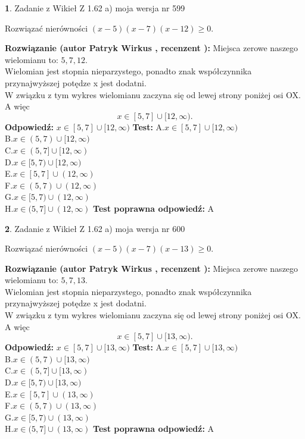 \documentclass[12pt, a4paper]{article}
\theoremstyle{definition} %
\newtheorem{zad}{}
\newcommand{\zadStart}[1]{\begin{zad}#1\newline}
\newcommand{\zadStop}{\end{zad}}
\newcommand{\rozwStart}[2]{\noindent \textbf{Rozwiązanie (autor #1 , recenzent #2): }\newline}
\newcommand{\rozwStop}{\newline}
\newcommand{\odpStart}{\noindent \textbf{Odpowiedź:}\newline}
\newcommand{\odpStop}{\newline}
\newcommand{\testStart}{\noindent \textbf{Test:}\newline}
\newcommand{\testStop}{\newline}
\newcommand{\kluczStart}{\noindent \textbf{Test poprawna odpowiedź:}\newline}
\newcommand{\kluczStop}{\newline}
\begin{document}
\zadStart{Zadanie z Wikieł Z 1.62 a) moja wersja nr 599}

Rozwiązać nierówności $(x-5)(x-7)(x-12)\ge0$.
\zadStop
\rozwStart{Patryk Wirkus}{}
Miejsca zerowe naszego wielomianu to: $5, 7, 12$.\\
Wielomian jest stopnia nieparzystego, ponadto znak współczynnika przy\linebreak najwyższej potędze x jest dodatni.\\ W związku z tym wykres wielomianu zaczyna się od lewej strony poniżej osi OX. A więc $$x \in [5,7] \cup [12,\infty).$$
\rozwStop
\odpStart
$x \in [5,7] \cup [12,\infty)$
\odpStop
\testStart
A.$x \in [5,7] \cup [12,\infty)$\\
B.$x \in (5,7) \cup [12,\infty)$\\
C.$x \in (5,7] \cup [12,\infty)$\\
D.$x \in [5,7) \cup [12,\infty)$\\
E.$x \in [5,7] \cup (12,\infty)$\\
F.$x \in (5,7) \cup (12,\infty)$\\
G.$x \in [5,7) \cup (12,\infty)$\\
H.$x \in (5,7] \cup (12,\infty)$
\testStop
\kluczStart
A
\kluczStop



\zadStart{Zadanie z Wikieł Z 1.62 a) moja wersja nr 600}

Rozwiązać nierówności $(x-5)(x-7)(x-13)\ge0$.
\zadStop
\rozwStart{Patryk Wirkus}{}
Miejsca zerowe naszego wielomianu to: $5, 7, 13$.\\
Wielomian jest stopnia nieparzystego, ponadto znak współczynnika przy\linebreak najwyższej potędze x jest dodatni.\\ W związku z tym wykres wielomianu zaczyna się od lewej strony poniżej osi OX. A więc $$x \in [5,7] \cup [13,\infty).$$
\rozwStop
\odpStart
$x \in [5,7] \cup [13,\infty)$
\odpStop
\testStart
A.$x \in [5,7] \cup [13,\infty)$\\
B.$x \in (5,7) \cup [13,\infty)$\\
C.$x \in (5,7] \cup [13,\infty)$\\
D.$x \in [5,7) \cup [13,\infty)$\\
E.$x \in [5,7] \cup (13,\infty)$\\
F.$x \in (5,7) \cup (13,\infty)$\\
G.$x \in [5,7) \cup (13,\infty)$\\
H.$x \in (5,7] \cup (13,\infty)$
\testStop
\kluczStart
A
\kluczStop
\end{document}
